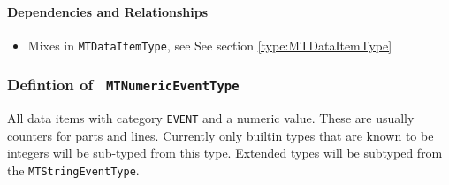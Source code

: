 \paragraph{Dependencies and Relationships}

\begin{itemize}
\item Mixes in \texttt{MTDataItemType}, see See section \ref{type:MTDataItemType}
\end{itemize}
\FloatBarrier
\subsubsection{Defintion of \texttt{ MTNumericEventType}}
  \label{type:MTNumericEventType}

\FloatBarrier

All data items with category \texttt{EVENT} and a numeric value. These are usually counters for 
parts and lines. Currently only builtin types that are known to be integers will be
sub-typed from this type. Extended types will be subtyped from the \texttt{MTStringEventType}.

